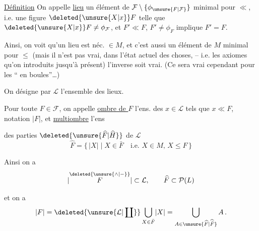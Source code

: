 


\noindent\llap{\smash{\rule[-2.1\baselineskip]{.35pt}{2.8\baselineskip}}\hspace{.6em}}\uline{Définition} On appelle \uline{lieu}  un élément de $\mathcal F\setminus\{\phi_{\unsure{F|\mathcal F}}\}$ minimal pour $\ll$, i.e. une figure $\deleted{\unsure{X|x}}F$ telle que $\deleted{\unsure{X|x}}F\neq\phi_{\mathcal F}$, et $F'\ll F$, $F'\neq\phi_F$ implique $F'=F$.

Ainsi, on voit qu'un lieu est néc. $\in M$, et c'est aussi un élément de $M$ minimal pour $\leq$ (mais il n'est pas vrai, dans l'état actuel des choses, -- i.e.  les axiomes qu'on  introduits jusqu'à présent) l'inverse soit vrai. (Ce sera vrai cependant pour les `` en boules''\ldots)

On désigne par $\mathcal L$ l'ensemble des lieux.

 Pour toute $F\in\mathcal F$, on appelle \uline{ombre de $F$} l'ens. des $x\in\mathcal L$ tels que $x\ll F$, notation $\lvert F\rvert$, et \uline{multiombre} l'ens

des parties $\deleted{\unsure{\widehat F|\widehat H}}$ de $\mathcal L$
\[
\widehat F=\bigl\{\,\lvert X\rvert\mid X\in\bar F\quad\text{i.e. }X\in M,\,X\leq F\,\bigr\}
\]

Ainsi on a
\[
\lvert\overset{\deleted{\unsure{\wedge|{-}}}}{F}\rvert\subset\mathcal L,\qquad
\widehat F\subset\mathcal P(L)
\]

et on a
\[
\lvert F\rvert=\deleted{\unsure{\mathcal L|\coprod}}\bigcup_{X\in\bar F}\lvert X\rvert=\bigcup_{A\in\unsure{\widehat F|\widehat{\bar F}}}A\,.
\]

